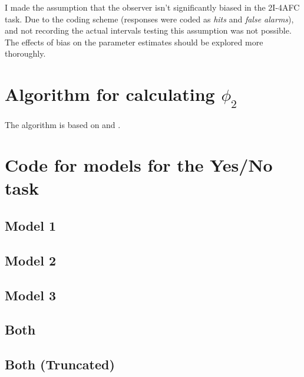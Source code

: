 \documentclass{article}\usepackage{knitr}
\begin{document}
I made the assumption that the observer isn't significantly biased in the 2I-4AFC task. Due to the coding scheme (responses were coded as \textit{hits} and \textit{false alarms}), and not recording the actual intervals testing this assumption was not possible. The effects of bias on the parameter estimates should be explored more thoroughly.

\clearpage



\newpage


\appendix
{}

\section{Algorithm for calculating $\phi_2$}

The algorithm is based on \citet{boys1989} and \citet{pan2017}.



\newpage
\section{Code for models for the Yes/No task}

\subsection{Model 1}


\subsection{Model 2}


\subsection{Model 3}


\subsection{Both}


\subsection{Both (Truncated)}

\end{document}
